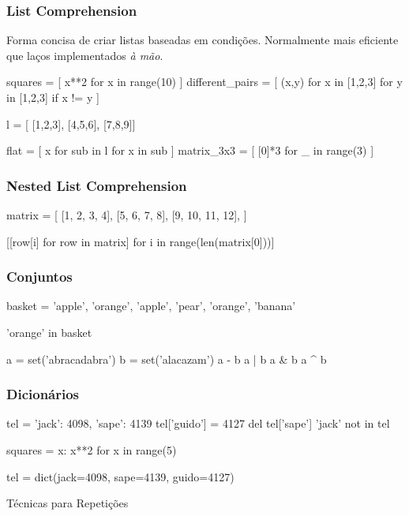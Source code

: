 \begin{frame}[fragile]
    \frametitle{List Comprehension}
    Forma concisa de criar listas baseadas em condições. Normalmente
    mais eficiente que laços implementados \textit{à mão}.
    \begin{python}
        squares = [ x**2 for x in range(10) ]
        different_pairs = [ (x,y) for x in [1,2,3]
                                  for y in [1,2,3] if x != y ]

        l = [ [1,2,3], [4,5,6], [7,8,9]]

        flat = [ x for sub in l for x in sub ]
        matrix_3x3 = [ [0]*3 for _ in range(3) ]
    \end{python}
\end{frame}

\begin{frame}[fragile]
    \frametitle{Nested List Comprehension}
    \begin{python}
        matrix = [
            [1, 2, 3, 4],
            [5, 6, 7, 8],
            [9, 10, 11, 12],
        ]

        [[row[i] for row in matrix]
            for i in range(len(matrix[0]))]
    \end{python}
\end{frame}

\begin{frame}[fragile]
    \frametitle{Conjuntos}
    \begin{python}
        basket = {'apple', 'orange', 'apple',
                  'pear', 'orange', 'banana'}

        'orange' in basket

        a = set('abracadabra')
        b = set('alacazam')
        a - b
        a | b
        a & b
        a ^ b
    \end{python}
\end{frame}

\begin{frame}[fragile]
    \frametitle{Dicionários}
    \begin{python}
        tel = {'jack': 4098, 'sape': 4139}
        tel['guido'] = 4127
        del tel['sape']
        'jack' not in tel

        squares = { x: x**2 for x in range(5) }

        tel = dict(jack=4098, sape=4139, guido=4127)
    \end{python}
\end{frame}

\begin{frame}
    \begin{center}
        \Huge Técnicas para Repetições
    \end{center}
\end{frame}

